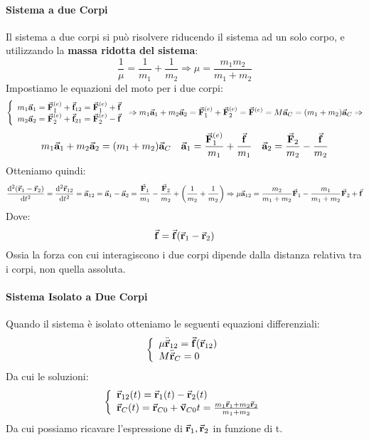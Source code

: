 \documentclass{article}
\newcommand{\then}{\ensuremath{\Rightarrow}}
\renewcommand{\a}{\va{a}}
\renewcommand{\v}{\va{v}}
\renewcommand{\r}{\va{r}}
\newcommand{\F}{\va{F}}
\newcommand{\f}{\va{f}}
\begin{document}
\paragraph{Sistema a due Corpi}
Il sistema a due corpi si può risolvere riducendo il sistema ad un solo corpo, e utilizzando la \textbf{massa ridotta del sistema}:
\begin{equation}
    \frac{1}{\mu}=\frac{1}{m_1}+\frac{1}{m_2}\then\boxed{\mu=\frac{m_1m_2}{m_1+m_2}}
\end{equation}
Impostiamo le equazioni del moto per i due corpi:
\begin{equation}
\left\{\begin{array}{l}
    m_1\a_1=\F_1^{(e)}+\f_{12}=\F_1^{(e)}+\f  \\
    m_2\a_2=\F_2^{(e)}+\f_{21}=\F_2^{(e)}-\f 
\end{array}\right.\then m_1\a_1+m_2\a_2=\F_1^{(e)}+\F_2^{(e)}=\F^{(e)}=M\a_C=(m_1+m_2)\a_C\then
\end{equation}
\begin{equation}
    m_1\a_1+m_2\a_2=(m_1+m_2)\a_C\quad \a_1=\frac{\F_1^{(e)}}{m_1}+\frac{\f}{m_1}\quad \a_2=\frac{\F_2}{m_2}-\frac{\f}{m_2}
\end{equation}
Otteniamo quindi:
\begin{equation}
    \dv[2]{(\r_1-\r_2)}{t}=\dv[2]{\r_{12}}{t}=\a_{12}=\a_1-\a_2=\frac{\F_1}{m_1}-\frac{\F_2}{m_2}+\left(\frac{1}{m_2}+\frac{1}{m_2}\right)\then \mu\a_{12}=\frac{m_2}{m_1+m_2}\F_1-\frac{m_1}{m_1+m_2}\F_2+\f 
\end{equation}
Dove: \[\f=\f(\r_1-\r_2)\]
Ossia la forza con cui interagiscono i due corpi dipende dalla distanza relativa tra i corpi, non quella assoluta. 
\paragraph{Sistema Isolato a Due Corpi}
Quando il sistema è isolato otteniamo le seguenti equazioni differenziali:
\begin{equation}
\left\{\begin{array}{l}
    \mu\ddot{\r}_{12}=\f(\r_{12}) \\
    M\ddot{\r}_C=0
\end{array}
\right.
\end{equation}
Da cui le soluzioni:
\begin{equation}
\left\{\begin{array}{l}
    \r_{12}(t)=\r_1(t)-\r_2(t)  \\
     \r_C(t)=\r_{C0}+\v_{C0}t=\frac{m_1\r_1+m_2\r_2}{m_1+m_2} 
\end{array}\right.
\end{equation}
Da cui possiamo ricavare l'espressione di $\r_1,\r_2$ in funzione di t.
\end{document}
